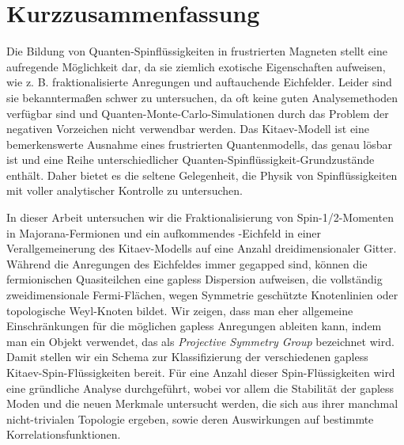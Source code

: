 \chapter*{Kurzzusammenfassung}
%
%
Die Bildung von Quanten-Spinfl\"ussigkeiten in frustrierten Magneten stellt eine aufregende M\"oglichkeit dar, da sie ziemlich exotische Eigenschaften aufweisen, wie z. B. fraktionalisierte Anregungen und auftauchende Eichfelder.
Leider sind sie bekannterma\ss en schwer zu untersuchen, da oft keine guten Analysemethoden verf\"ugbar sind und Quanten-Monte-Carlo-Simulationen durch das Problem der negativen Vorzeichen nicht verwendbar werden.
Das Kitaev-Modell ist eine bemerkenswerte Ausnahme eines frustrierten Quantenmodells, das genau l\"osbar ist und eine Reihe unterschiedlicher Quanten-Spinfl\"ussigkeit-Grundzust\"ande enth\"alt.
Daher bietet es die seltene Gelegenheit, die Physik von Spinfl\"ussigkeiten mit voller analytischer Kontrolle zu untersuchen.

In dieser Arbeit untersuchen wir die Fraktionalisierung von Spin-1/2-Momenten in Majorana-Fermionen und ein aufkommendes \ZZ-Eichfeld in einer Ver\-all\-ge\-mei\-ne\-rung des Kitaev-Modells auf eine Anzahl dreidimensionaler Gitter.
W\"ahrend die Anregungen des Eichfeldes immer gegapped sind, k\"onnen die fermionischen Quasiteilchen eine gapless Dispersion aufweisen, die vollst\"andig zweidimensionale Fermi-Fl\"achen, wegen Symmetrie gesch\"utzte Knotenlinien oder topologische Weyl-Knoten bildet.
Wir zeigen, dass man eher allgemeine Einschr\"ankungen f\"ur die m\"oglichen gapless Anregungen ableiten kann, indem man ein Objekt verwendet, das als \textit{Projective Symmetry Group} bezeichnet wird.
Damit stellen wir ein Schema zur Klassifizierung der verschiedenen gapless Kitaev-Spin-Fl\"ussigkeiten bereit.
F\"ur eine Anzahl dieser Spin-Fl\"ussigkeiten wird eine gr\"undliche Analyse durchgef\"uhrt, wobei vor allem die Stabilit\"at der gapless Moden und die neuen Merkmale untersucht werden, die sich aus ihrer manchmal nicht-trivialen Topologie ergeben, sowie deren Auswirkungen auf bestimmte Korrelationsfunktionen.